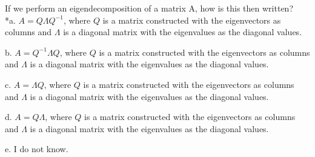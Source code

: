  
If we perform an eigendecomposition of a matrix A, how is this then written?\\

*a. $A = Q\Lambda Q^{-1}$, where $Q$ is a matrix constructed with the eigenvectors as columns and $\Lambda$ is a diagonal matrix with the eigenvalues as the diagonal values.

b. $A = Q^{-1} \Lambda Q$, where $Q$ is a matrix constructed with the eigenvectors as columns and $\Lambda$ is a diagonal matrix with the eigenvalues as the diagonal values. 

c. $A = \Lambda Q$, where $Q$ is a matrix constructed with the eigenvectors as columns and $\Lambda$ is a diagonal matrix with the eigenvalues as the diagonal values. 

d. $A = Q\Lambda$, where $Q$ is a matrix constructed with the eigenvectors as columns and $\Lambda$ is a diagonal matrix with the eigenvalues as the diagonal values. 

e. I do not know.\\
